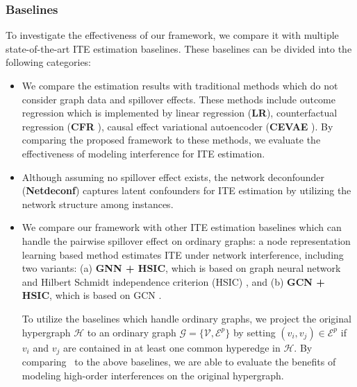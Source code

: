 \subsubsection{Baselines}
To investigate the effectiveness of our framework, we compare it with multiple state-of-the-art ITE estimation baselines. These baselines can be divided into the following categories:
\begin{itemize}
    \item {} We compare the estimation results with traditional methods which do not consider graph data and spillover effects. These methods include outcome regression which is implemented by linear regression (\textbf{LR}), counterfactual regression (\textbf{CFR} \cite{CFR}), causal effect variational autoencoder (\textbf{CEVAE} \cite{CEVAE}). By comparing the proposed framework to these methods, we evaluate the effectiveness of modeling interference for ITE estimation.
    \item {} Although assuming no  spillover effect exists, the network deconfounder (\textbf{Netdeconf}) \cite{guo2020learning} captures latent confounders for ITE estimation by utilizing the network structure among instances. 
    \item {} We compare our framework with other ITE estimation baselines which can handle the pairwise spillover effect on ordinary graphs: %
    a node representation learning based method \cite{ma2021causal} estimates ITE under network interference, including two variants: (a) \textbf{GNN + HSIC}, which is based on graph neural network \cite{morris2019weisfeiler} and Hilbert Schmidt independence criterion (HSIC) \cite{gretton2005measuring}, and (b) \textbf{GCN + HSIC}, which is based on GCN \cite{kipf2016semi}. 
    
    To utilize the baselines which handle ordinary graphs, 
    we project the original hypergraph $\mathcal{H}$ to an ordinary graph $\mathcal{G}=\{\mathcal{V}, \mathcal{E}^p\}$ by setting $(v_i,v_j)\in \mathcal{E}^p$ if $v_i$ and $v_j$ are contained in at least one common hyperedge in $\mathcal{H}$. By comparing \mymodel~to the above baselines, we are able to evaluate the benefits of modeling high-order interferences on the original hypergraph.
\end{itemize}

